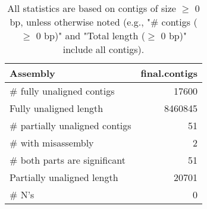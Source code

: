 \documentclass[12pt,a4paper]{article}
\begin{document}
\begin{table}[ht]
\begin{center}
\caption{All statistics are based on contigs of size $\geq$ 0 bp, unless otherwise noted (e.g., "\# contigs ($\geq$ 0 bp)" and "Total length ($\geq$ 0 bp)" include all contigs).}
\begin{tabular}{|l*{1}{|r}|}
\hline
Assembly & final.contigs \\ \hline
\# fully unaligned contigs & 17600 \\ \hline
Fully unaligned length & 8460845 \\ \hline
\# partially unaligned contigs & 51 \\ \hline
\hspace{5mm}\# with misassembly & 2 \\ \hline
\hspace{5mm}\# both parts are significant & 51 \\ \hline
Partially unaligned length & 20701 \\ \hline
\# N's & 0 \\ \hline
\end{tabular}
\end{center}
\end{table}
\end{document}

